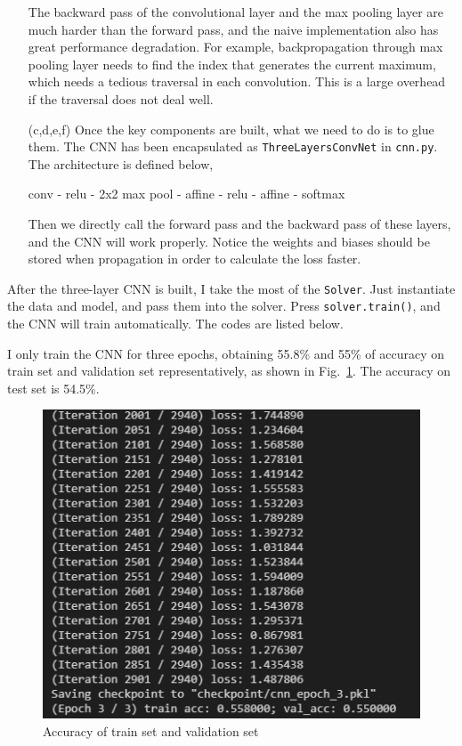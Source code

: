 \documentclass[a4paper, 11pt]{article}
\begin{document}
\begin{enumerate}
	The backward pass of the convolutional layer and the max pooling layer are much harder than the forward pass, and the naive implementation also has great performance degradation.
	For example, backpropagation through max pooling layer needs to find the index that generates the current maximum, which needs a tedious traversal in each convolution.
	This is a large overhead if the traversal does not deal well.

	\item [(c,d,e,f)] Once the key components are built, what we need to do is to glue them.
	The CNN has been encapsulated as \verb'ThreeLayersConvNet' in \verb'cnn.py'.
	The architecture is defined below,
\begin{center}
conv - relu - 2x2 max pool - affine - relu - affine - softmax
\end{center}
	Then we directly call the forward pass and the backward pass of these layers, and the CNN will work properly.
	Notice the weights and biases should be stored when propagation in order to calculate the loss faster.
\end{enumerate}

After the three-layer CNN is built, I take the most of the \verb'Solver'.
Just instantiate the data and model, and pass them into the solver.
Press \verb'solver.train()', and the CNN will train automatically.
The codes are listed below.


I only train the CNN for three epochs, obtaining 55.8\% and 55\% of accuracy on train set and validation set representatively, as shown in Fig.~\ref{fig:acc}.
The accuracy on test set is 54.5\%.
\begin{figure}[H]
\centering
\includegraphics[width=0.6\linewidth]{fig/results/train_acc2.png}
\caption{Accuracy of train set and validation set}
\label{fig:acc}
\end{figure}
\end{document}

